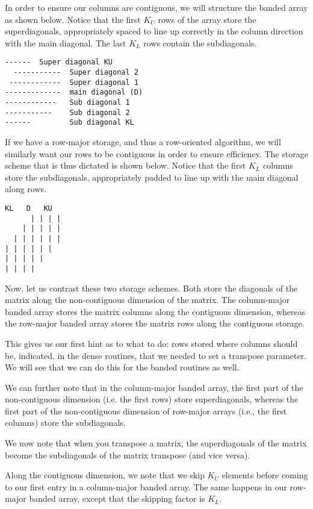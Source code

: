 \documentclass{article}
\begin{document}
In order to ensure our columns are contiguous, we will structure the banded
array as shown below.  Notice that the first $K_U$ rows
of the array store the superdiagonals, appropriately spaced to line up
correctly in the column direction with the main diagonal.  The last $K_L$
rows contain the subdiagonals.

{\samepage
\begin{Verbatim}[fontsize=\small,fontfamily=tt,fontshape=rm]
       ------  Super diagonal KU
  -----------  Super diagonal 2
 ------------  Super diagonal 1
-------------  main diagonal (D)
------------   Sub diagonal 1
-----------    Sub diagonal 2
------         Sub diagonal KL
\end{Verbatim}
}

If we have a row-major storage, and thus a row-oriented algorithm, we will
similarly want our rows to be contiguous in order to ensure efficiency.
The storage scheme that is thus dictated is shown below.  Notice
that the first $K_L$ columns store the subdiagonals, appropriately padded
to line up with the main diagonal along rows.

{\samepage
\begin{Verbatim}[fontsize=\small,fontfamily=tt,fontshape=rm]
 KL   D   KU
      | | | |  
    | | | | |
  | | | | | |
| | | | | |  
| | | | |    
| | | |      
\end{Verbatim}
}

Now, let us contrast these two storage schemes.  Both store
the diagonals of the matrix along the non-contiguous dimension of the matrix.
The column-major banded array stores the matrix columns along the contiguous
dimension, whereas the row-major banded array stores the matrix rows along the
contiguous storage.

This gives us our first hint as to what to do: rows stored where columns
should be, indicated, in the dense routines, that we needed to set a
transpose parameter.  We will see that we can do this for the banded routines
as well.

We can further note that in the column-major banded array, the first part of the
non-contiguous dimension (i.e. the first rows) store superdiagonals, whereas
the first part of the non-contiguous dimension of row-major arrays (i.e., the
first columns) store the subdiagonals.

We now note that when you transpose a matrix, the superdiagonals of the matrix
become the subdiagonals of the matrix transpose (and vice versa).

Along the contiguous dimension, we note that we skip $K_U$ elements before
coming to our first entry in a column-major banded array.  The same happens
in our row-major banded array, except that the skipping factor is $K_L$.
\end{document}
